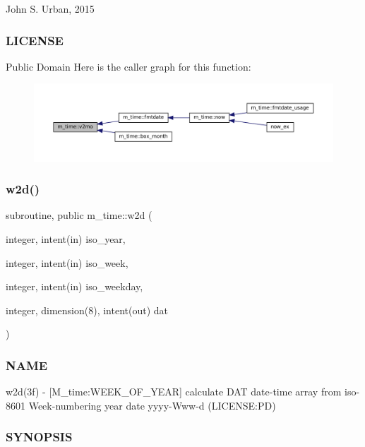 John S. Urban, 2015 \subsubsection*{L\+I\+C\+E\+N\+SE}

Public Domain Here is the caller graph for this function\+:\nopagebreak
\begin{figure}[H]
\begin{center}
\leavevmode
\includegraphics[width=350pt]{namespacem__time_a6f28cf00e4998bb50bb503f5e4bd3f77_icgraph}
\end{center}
\end{figure}
\mbox{\label{namespacem__time_ac0ec48db8d508bfa23fe4b20c9d1c5a3}} 
\subsubsection{\texorpdfstring{w2d()}{w2d()}}
{\footnotesize\ttfamily subroutine, public m\+\_\+time\+::w2d (\begin{DoxyParamCaption}\item[{integer, intent(in)}]{iso\+\_\+year,  }\item[{integer, intent(in)}]{iso\+\_\+week,  }\item[{integer, intent(in)}]{iso\+\_\+weekday,  }\item[{integer, dimension(8), intent(out)}]{dat }\end{DoxyParamCaption})}



\subsubsection*{N\+A\+ME}

w2d(3f) -\/ \mbox{[}M\+\_\+time\+:W\+E\+E\+K\+\_\+\+O\+F\+\_\+\+Y\+E\+AR\mbox{]} calculate D\+AT date-\/time array from iso-\/8601 Week-\/numbering year date yyyy-\/\+Www-\/d (L\+I\+C\+E\+N\+SE\+:PD) 

\subsubsection*{S\+Y\+N\+O\+P\+S\+IS}

